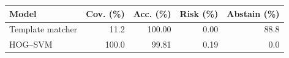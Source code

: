 \begin{tabular}{lrrrr}
\toprule
Model & Cov. (\%) & Acc. (\%) & Risk (\%) & Abstain (\%) \\
\midrule
Template matcher & 11.2 & 100.00 & 0.00 & 88.8 \\
HOG--SVM & 100.0 & 99.81 & 0.19 & 0.0 \\
\bottomrule
\end{tabular}
